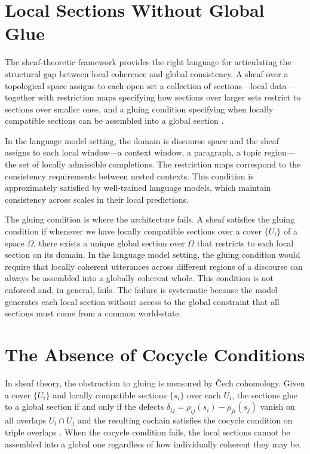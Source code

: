 \documentclass[11pt, oneside]{article}
\begin{document}
\section{Local Sections Without Global Glue}

The sheaf-theoretic framework provides the right language for articulating the structural gap between local coherence and global consistency. A sheaf over a topological space assigns to each open set a collection of sections---local data---together with restriction maps specifying how sections over larger sets restrict to sections over smaller ones, and a gluing condition specifying when locally compatible sections can be assembled into a global section \cite{bredon1997sheaf}.

In the language model setting, the domain is discourse space and the sheaf assigns to each local window---a context window, a paragraph, a topic region---the set of locally admissible completions. The restriction maps correspond to the consistency requirements between nested contexts. This condition is approximately satisfied by well-trained language models, which maintain consistency across scales in their local predictions.

The gluing condition is where the architecture fails. A sheaf satisfies the gluing condition if whenever we have locally compatible sections over a cover $\{U_i\}$ of a space $\Omega$, there exists a unique global section over $\Omega$ that restricts to each local section on its domain. In the language model setting, the gluing condition would require that locally coherent utterances across different regions of a discourse can always be assembled into a globally coherent whole. This condition is not enforced and, in general, fails. The failure is systematic because the model generates each local section without access to the global constraint that all sections must come from a common world-state.

\section{The Absence of Cocycle Conditions}

In sheaf theory, the obstruction to gluing is measured by \v{C}ech cohomology. Given a cover $\{U_i\}$ and locally compatible sections $\{s_i\}$ over each $U_i$, the sections glue to a global section if and only if the defects $\delta_{ij} = \rho_{ij}(s_i) - \rho_{ji}(s_j)$ vanish on all overlaps $U_i \cap U_j$ and the resulting cochain satisfies the cocycle condition on triple overlaps \cite{bott1982differential}. When the cocycle condition fails, the local sections cannot be assembled into a global one regardless of how individually coherent they may be.
\end{document}
